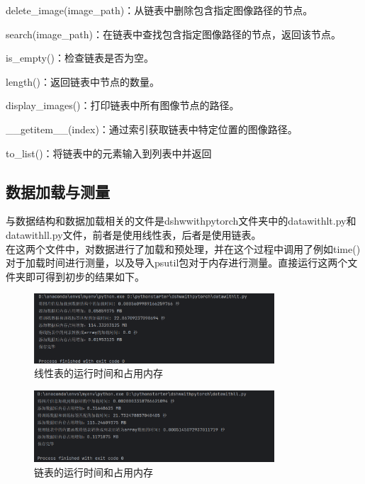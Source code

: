 \noindent delete\_image(image\_path)：从链表中删除包含指定图像路径的节点。

\noindent search(image\_path)：在链表中查找包含指定图像路径的节点，返回该节点。

\noindent is\_empty()：检查链表是否为空。

\noindent length()：返回链表中节点的数量。

\noindent display\_images()：打印链表中所有图像节点的路径。

\noindent \_\_getitem\_\_(index)：通过索引获取链表中特定位置的图像路径。

\noindent to\_list()：将链表中的元素输入到列表中并返回

\subsection{数据加载与测量}
与数据结构和数据加载相关的文件是dshwwithpytorch文件夹中的datawithlt.py和datawithll.py文件，前者是使用线性表，后者是使用链表。\\

在这两个文件中，对数据进行了加载和预处理，并在这个过程中调用了例如time()对于加载时间进行测量，以及导入psutil包对于内存进行测量。直接运行这两个文件夹即可得到初步的结果如下。

\begin{figure}[H]
	\centering
	\includegraphics[width=0.8\textwidth]{lt.png}  %
	\caption{线性表的运行时间和占用内存}
	\label{fig:example}
\end{figure}

\begin{figure}[H]
	\centering
	\includegraphics[width=0.8\textwidth]{ll.png}  %
	\caption{链表的运行时间和占用内存}
	\label{fig:example}
\end{figure}

